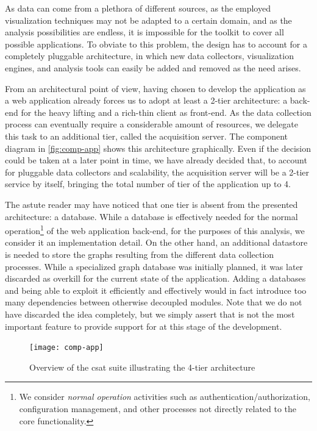 As data can come from a plethora of different sources, as the employed visualization techniques may not be adapted to a certain domain, and as the analysis possibilities are endless, it is impossible for the toolkit to cover all possible applications. To obviate to this problem, the design has to account for a completely pluggable architecture, in which new data collectors, visualization engines, and analysis tools can easily be added and removed as the need arises.

From an architectural point of view, having chosen to develop the application as a web application already forces us to adopt at least a 2-tier architecture: a back-end for the heavy lifting and a rich-thin client as front-end. As the data collection process can eventually require a considerable amount of resources, we delegate this task to an additional tier, called the acquisition server. The component diagram in \vref{fig:comp-app} shows this architecture graphically. Even if the decision could be taken at a later point in time, we have already decided that, to account for pluggable data collectors and scalability, the acquisition server will be a 2-tier service by itself, bringing the total number of tier of the application up to 4.

The astute reader may have noticed that one tier is absent from the presented architecture: a database. While a database is effectively needed for the normal operation\footnote{We consider \emph{normal operation} activities such as authentication/authorization, configuration management, and other processes not directly related to the core functionality.} of the web application back-end, for the purposes of this analysis, we consider it an implementation detail. On the other hand, an additional datastore is needed to store the graphs resulting from the different data collection processes. While a specialized graph database was initially planned, it was later discarded as overkill for the current state of the application. Adding a databases and being able to exploit it efficiently and effectively would in fact introduce too many dependencies between otherwise decoupled modules. Note that we do not have discarded the idea completely, but we simply assert that is not the most important feature to provide support for at this stage of the development.

\begin{figure}
  \begin{adjustwidth}{-0.3mm}{-0.7mm}
	  \texttt{[image: comp-app]}
  \end{adjustwidth}
	\caption[Architectural overview of the \gls{csat} software suite.]{Overview of the \gls{csat} suite illustrating the 4-tier architecture}
	\label{fig:comp-app}
\end{figure}

